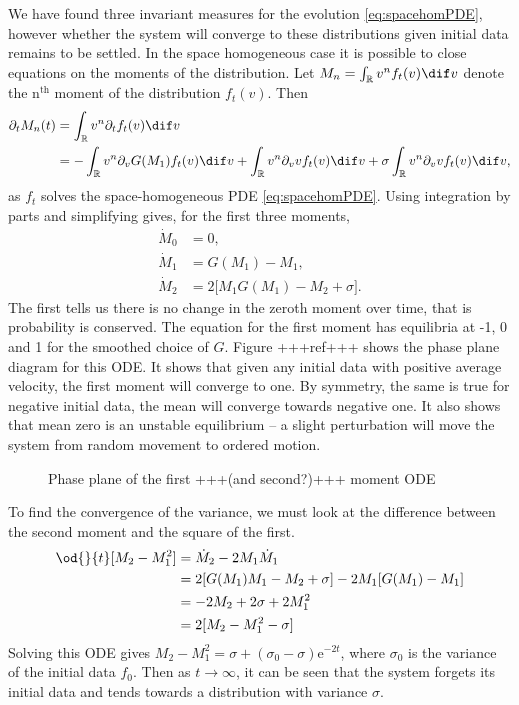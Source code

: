         We have found three invariant measures for the evolution \eqref{eq:spacehomPDE}, however whether the system will converge to these distributions given initial data remains to be settled. In the space homogeneous case it is possible to close equations on the moments of the distribution. Let $M_n = \int_\R v^n f_t(v) \dif v$ denote the n$^\text{th}$ moment of the distribution $f_t(v)$. Then
        \begin{align*}
            \partial_t M_n(t) &= \int_{\R}v^n \partial_t  f_t(v) \dif v\\
            &= - \int_{\R}v^n \partial_v G(M_1)f_t(v) \dif v + \int_{\R}v^n \partial_v vf_t(v) \dif v + \sigma \int_{\R}v^n \partial_vv f_t(v) \dif v,
        \end{align*}
        as $f_t$ solves the space-homogeneous PDE \eqref{eq:spacehomPDE}. Using integration by parts and simplifying gives, for the first three moments,
        \begin{align*}
            \dot{M}_0 &= 0,\\
            \dot{M}_1 &= G(M_1) - M_1,\\
            \dot{M}_2 &= 2\lbrack M_1G(M_1) - M_2 + \sigma\rbrack.
        \end{align*}
        The first tells us there is no change in the zeroth moment over time, that is probability is conserved. The equation for the first moment has equilibria at -1, 0 and 1 for the smoothed choice of $G$. Figure +++ref+++ shows the phase plane diagram for this ODE. It shows that given any initial data with positive average velocity, the first moment will converge to one. By symmetry, the same is true for negative initial data, the mean will converge towards negative one. It also shows that mean zero is an unstable equilibrium -- a slight perturbation will move the system from random movement to ordered motion.
        \begin{figure}
            \centering
            \caption{Phase plane of the first  +++(and second?)+++ moment ODE}
            \label{fig:M1phase}
        \end{figure}
        To find the convergence of the variance, we must look at the difference between the second moment and the square of the first.
        \begin{align*}
            \od{}{t}\lbrack M_2 - M_1^2\rbrack &= \dot{M}_2 - 2M_1\dot{M}_1\\
            &= 2\lbrack G(M_1)M_1 - M_2 +\sigma\rbrack - 2M_1\lbrack G(M_1) - M_1\rbrack\\
            &= -2M_2 +2\sigma + 2M_1^2\\
            &= 2\lbrack M_2 - M_1^2 -\sigma\rbrack             
        \end{align*}
        Solving this ODE gives $M_2-M_1^2 = \sigma +(\sigma_0-\sigma)\mathrm{e}^{-2t}$, where $\sigma_0$ is the variance of the initial data $f_0$. Then as $t \to \infty$, it can be seen that the system forgets its initial data and tends towards a distribution with variance $\sigma$.
        
